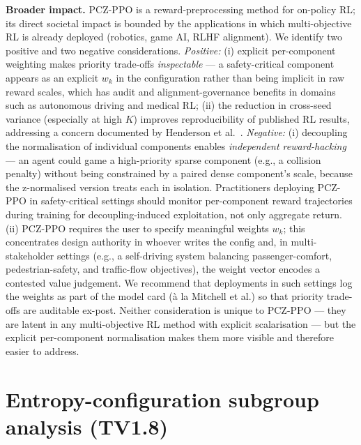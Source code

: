 \documentclass[11pt,a4paper]{article}
\begin{document}
\textbf{Broader impact.} PCZ-PPO is a reward-preprocessing method for on-policy RL; its direct societal impact is bounded by the applications in which multi-objective RL is already deployed (robotics, game AI, RLHF alignment). We identify two positive and two negative considerations. \emph{Positive:} (i) explicit per-component weighting makes priority trade-offs \emph{inspectable} --- a safety-critical component appears as an explicit $w_k$ in the configuration rather than being implicit in raw reward scales, which has audit and alignment-governance benefits in domains such as autonomous driving and medical RL; (ii) the reduction in cross-seed variance (especially at high $K$) improves reproducibility of published RL results, addressing a concern documented by Henderson et al.~\cite{henderson2018deeprl}. \emph{Negative:} (i) decoupling the normalisation of individual components enables \emph{independent reward-hacking} --- an agent could game a high-priority sparse component (e.g., a collision penalty) without being constrained by a paired dense component's scale, because the z-normalised version treats each in isolation. Practitioners deploying PCZ-PPO in safety-critical settings should monitor per-component reward trajectories during training for decoupling-induced exploitation, not only aggregate return. (ii) PCZ-PPO requires the user to specify meaningful weights $w_k$; this concentrates design authority in whoever writes the config and, in multi-stakeholder settings (e.g., a self-driving system balancing passenger-comfort, pedestrian-safety, and traffic-flow objectives), the weight vector encodes a contested value judgement. We recommend that deployments in such settings log the weights as part of the model card (\`a la Mitchell et al.) so that priority trade-offs are auditable ex-post. Neither consideration is unique to PCZ-PPO --- they are latent in any multi-objective RL method with explicit scalarisation --- but the explicit per-component normalisation makes them more visible and therefore easier to address.




\section{Entropy-configuration subgroup analysis (TV1.8)}
\label{app:entropy_subgroup}
\end{document}
